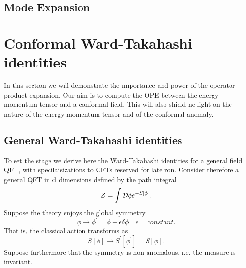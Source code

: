  \subsection{Mode Expansion}
 

 \section{Conformal Ward-Takahashi identities}
 In this section we will demonstrate the importance and power of the operator product expansion. Our aim is to compute the OPE between the energy momentum tensor and a conformal field. This will also shield ne light on the nature of the energy momentum tensor and of the conformal anomaly.
 \subsection{General Ward-Takahashi identities}
 To set the stage we derive here the Ward-Takahashi identities for a general field QFT, with specilaisizations to CFTs reserved for late ron. Consider therefore a general QFT in $\mathrm{d}$ dimensions defined by the path integral
 \begin{equation}
 Z=\int \mathcal{D} \phi e^{-S[\phi]}.
 \end{equation}
 Suppose the theory enjoys the global symmetry
 \begin{equation}
 \label{eq:globalsymmetry}
 \phi \rightarrow \phi^\prime = \phi + \epsilon \delta \phi \quad \epsilon=constant.
 \end{equation}
 That is, the classical action transforms as
 \begin{equation}
 S[\phi] \longrightarrow S^\prime [\phi^\prime] = S[\phi].
 \end{equation}
 Suppose furthermore that the symmetry is non-anomalous, i.e. the measure is invariant.
 
